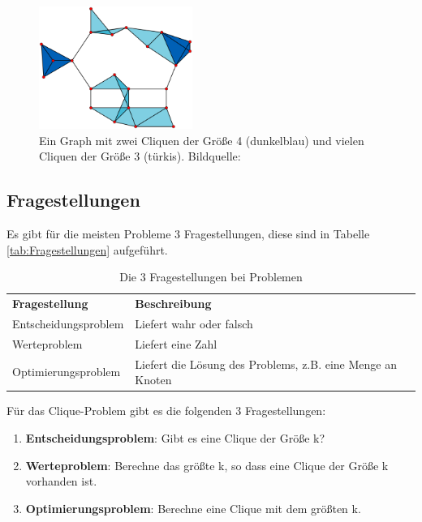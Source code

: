\documentclass[ngerman]{article}
\begin{document}
\begin{figure}[H]
	\centering
	\includegraphics[width=5cm]{figures/clique2.png}
	\caption[Ein Graph mit zwei Cliquen der Größe 4]{Ein Graph mit zwei Cliquen der Größe 4 (dunkelblau) und vielen Cliquen der Größe 3 (türkis). Bildquelle: \cite{cliqueImage2}}
	\label{fig:Clique4}
\end{figure}

\subsection{Fragestellungen}
Es gibt für die meisten Probleme 3 Fragestellungen, diese sind in Tabelle \vref{tab:Fragestellungen} aufgeführt.
\begin{table}[H]
	\centering
	\begin{tabular}{ | p{} | p{} | }
		\hline \rowcolor{gray!15}
		\textbf{Fragestellung} & \textbf{Beschreibung} \\ \hhline{|=|=|}
		Entscheidungsproblem & Liefert wahr oder falsch \\ \hline
		Werteproblem & Liefert eine Zahl \\ \hline
		Optimierungsproblem & Liefert die Lösung des Problems, z.B. eine Menge an Knoten \\ \hline	
	\end{tabular}
	\caption{Die 3 Fragestellungen bei Problemen}
	\label{tab:Fragestellungen}
\end{table}
Für das Clique-Problem gibt es die folgenden 3 Fragestellungen:
\begin{enumerate}
\item \textbf{Entscheidungsproblem}: Gibt es eine Clique der Größe k?\\
\item \textbf{Werteproblem}: Berechne das größte k, so dass eine Clique der Größe k vorhanden ist.\\
\item \textbf{Optimierungsproblem}: Berechne eine Clique mit dem größten k.\\
\end{enumerate}
\end{document}

